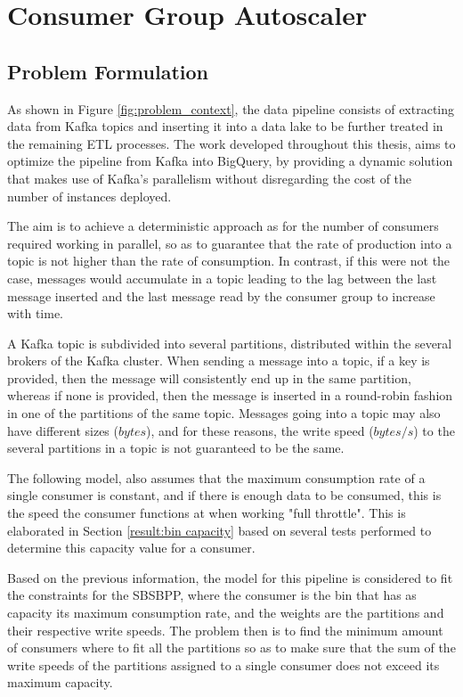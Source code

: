 \chapter{Consumer Group Autoscaler} 
\label{chap:consumer_group_autoscaler}

\section{Problem Formulation}

As shown in Figure \ref{fig:problem_context}, the data pipeline consists of
extracting data from Kafka topics and inserting it into a data lake to be
further treated in the remaining ETL processes.  The work developed throughout
this thesis, aims to optimize the pipeline from Kafka into BigQuery, by
providing a dynamic solution that makes use of Kafka's parallelism without
disregarding the cost of the number of instances deployed. 

The aim is to achieve a deterministic approach as for the number of consumers
required working in parallel, so as to guarantee that the rate of production
into a topic is not higher than the rate of consumption. In contrast, if this
were not the case, messages would accumulate in a topic leading to the lag
between the last message inserted and the last message read by the consumer
group to increase with time.

A Kafka topic is subdivided into several partitions, distributed within the
several brokers of the Kafka cluster. When sending a message into a topic, if a
key is provided, then the message will consistently end up in the same
partition, whereas if none is provided, then the message is inserted in a
round-robin fashion in one of the partitions of the same topic. Messages going
into a topic may also have different sizes ($bytes$), and for these reasons, the
write speed ($bytes/s$) to the several partitions in a topic is not guaranteed
to be the same. 

The following model, also assumes that the maximum consumption rate of a single
consumer is constant, and if there is enough data to be consumed, this is the
speed the consumer functions at when working "full throttle". This is
elaborated in Section \ref{result:bin capacity} based on several tests performed
to determine this capacity value for a consumer. 

Based on the previous information, the model for this pipeline is considered to
fit the constraints for the SBSBPP, where the consumer is the bin that has as
capacity its maximum consumption rate, and the weights are the partitions and
their respective write speeds. The problem then is to find the minimum amount of
consumers where to fit all the partitions so as to make sure that the sum of the
write speeds of the partitions assigned to a single consumer does not exceed its
maximum capacity. 

